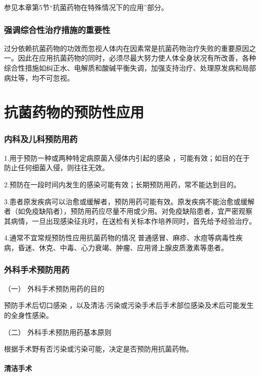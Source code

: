 参见本章第5节“抗菌药物在特殊情况下的应用”部分。

\subsubsection{强调综合性治疗措施的重要性}

过分依赖抗菌药物的功效而忽视人体内在因素常是抗菌药物治疗失败的重要原因之一。因此在应用抗菌药物的同时，必须尽最大努力使人体全身状况有所改善，各种综合性措施如纠正水、电解质和酸碱平衡失调，加强支持治疗、处理原发病和局部病灶等，均不可忽视。

\protect\hypertarget{text00431.html}{}{}

\section{抗菌药物的预防性应用}

\subsubsection{内科及儿科预防用药}

1.用于预防一种或两种特定病原菌入侵体内引起的感染
，可能有效；如目的在于防止任何细菌入侵，则往往无效。

2.预防在一段时间内发生的感染可能有效；长期预防用药，常不能达到目的。

3.患者原发疾病可以治愈或缓解者，预防用药可能有效。原发疾病不能治愈或缓解者（如免疫缺陷者），预防用药应尽量不用或少用。对免疫缺陷患者，宜严密观察其病情，一旦出现感染征兆时，在送检有关标本作培养同时，首先给予经验治疗。

4.通常不宜常规预防性应用抗菌药物的情况
普通感冒、麻疹、水痘等病毒性疾病，昏迷、休克、中毒、心力衰竭、肿瘤、应用肾上腺皮质激素等患者。

\subsubsection{外科手术预防用药}

\hypertarget{text00431.htmlux5cux23CHP17-7-2-2-1}{}
（一） 外科手术预防用药的目的

预防手术后切口感染
，以及清洁-污染或污染手术后手术部位感染及术后可能发生的全身性感染。

\hypertarget{text00431.htmlux5cux23CHP17-7-2-2-2}{}
（二） 外科手术预防用药基本原则

根据手术野有否污染或污染可能，决定是否预防用抗菌药物。

\paragraph{清洁手术}

